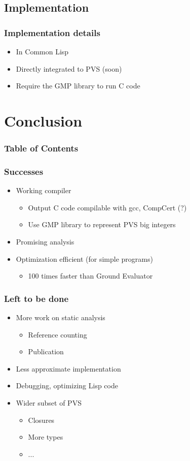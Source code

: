 \documentclass{beamer}
\begin{document}
\subsection{Implementation}

\begin{frame}
\frametitle{Implementation details}
\begin{itemize}
\itemsep2em
\item In Common Lisp
\item Directly integrated to PVS  (soon)
\item Require the GMP library to run C code
\end{itemize}

\end{frame}



\section{Conclusion}
\begin{frame}
\frametitle{Table of Contents}
\tableofcontents[currentsection]
\end{frame}

\begin{frame}
\frametitle{Successes}
\begin{itemize}
\itemsep2em
\item Working compiler
\begin{itemize}
\item Output C code compilable with gcc, CompCert (?)
\item Use GMP library to represent PVS big integers
\end{itemize}
\item Promising analysis
\item Optimization efficient (for simple programs)
\begin{itemize}
\item 100 times faster than Ground Evaluator
\end{itemize}
\end{itemize}
\end{frame}


\begin{frame}
\frametitle{Left to be done}
\begin{itemize}
\itemsep2em
\item More work on static analysis
\begin{itemize}
\item Reference counting
\item Publication
\end{itemize} 
\item Less approximate implementation
\item Debugging, optimizing Lisp code
\item Wider subset of PVS
\begin{itemize}
\item Closures
\item More types
\item ...
\end{itemize}
\end{itemize}
\end{frame}
\end{document}
